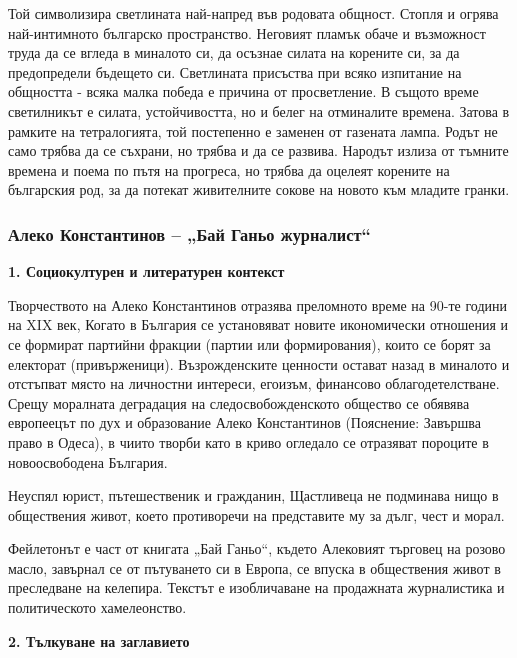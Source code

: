\documentclass[12pt,a4paper]{article}
\begin{document}
\indent Той символизира светлината най-напред във родовата общност. Стопля и огрява най-интимното българско пространство. Неговият пламък обаче и възможност труда да се вгледа в миналото си, да осъзнае силата на корените си, за да предопредели бъдещето си. Светлината присъства при всяко изпитание на общността - всяка малка победа е причина от просветление. В същото време светилникът е силата, устойчивостта, но и белег на отминалите времена. Затова в рамките на тетралогията, той постепенно е заменен от газената лампа. Родът не само трябва да се съхрани, но трябва и да се развива. Народът излиза от тъмните времена и поема по пътя на прогреса, но трябва да оцелеят корените на българския род, за да потекат живителните сокове на новото към младите гранки.
\newpage

\subsubsection{\colorbox{green!40}{Алеко Константинов – „Бай Ганьо журналист“}}
\textbf{1. Социокултурен и литературен контекст}
\vspace{0.1cm}
 
\indent Творчеството на Алеко Константинов отразява преломното време на 90-те години на XIX век, Когато в България се установяват новите икономически отношения и се формират партийни  фракции (партии или формирования), които се борят за електорат (привърженици). Възрожденските ценности остават назад в миналото и отстъпват място на личностни интереси, егоизъм, финансово облагодетелстване. Срещу моралната деградация на следосвобожденското общество се обявява европеецът по дух и образование Алеко Константинов (Пояснение: Завършва право в Одеса), в чиито творби като в криво огледало се отразяват пороците в новоосвободена България.
\vspace{0.1cm}
 
\indent Неуспял юрист, пътешественик и гражданин, Щастливеца не подминава нищо в обществения живот, което противоречи на представите му за дълг, чест и морал.
\vspace{0.1cm}
 
\indent Фейлетонът е част от книгата „Бай Ганьо“, където Алековият търговец на розово масло, завърнал се от пътуването си в Европа, се впуска в обществения живот в преследване на келепира. Текстът е изобличаване на продажната журналистика и политическото хамелеонство.
\vspace{0.1cm}
 
\textbf{2. Тълкуване на заглавието}
\vspace{0.1cm}
  
\end{document}
